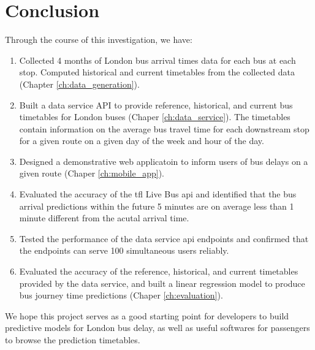 \chapter{Conclusion}
\par Through the course of this investigation, we have:

\begin{enumerate}
  \item Collected 4 months of London bus arrival times data for each bus at each stop. Computed historical and current timetables from the collected data (Chapter \ref{ch:data_generation}).
  \item Built a data service API to provide reference, historical, and current bus timetables for London buses (Chaper \ref{ch:data_service}). The timetables contain information on the average bus travel time for each downstream stop for a given route on a given day of the week and hour of the day.
  \item Designed a demonstrative web applicatoin to inform users of bus delays on a given route (Chaper \ref{ch:mobile_app}).
  \item Evaluated the accuracy of the \acrshort{tfl} Live Bus \acrshort{api} and identified that the bus arrival predictions within the future 5 minutes are on average less than 1 minute different from the acutal arrival time.
  \item Tested the performance of the data service \acrshort{api} endpoints and confirmed that the endpoints can serve 100 simultaneous users reliably.
  \item Evaluated the accuracy of the reference, historical, and current timetables provided by the data service, and built a linear regression model to produce bus journey time predictions (Chaper \ref{ch:evaluation}).
\end{enumerate}

\par We hope this project serves as a good starting point for developers to build predictive models for London bus delay, as well as useful softwares for passengers to browse the prediction timetables.
